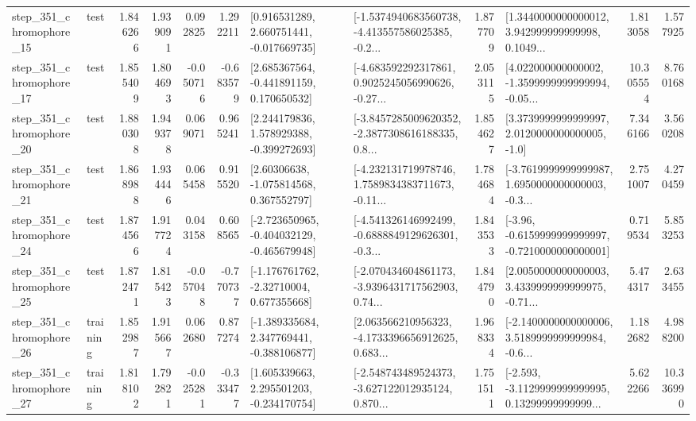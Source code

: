\begin{tabular}{llrrrrllrlrr}
  step\_351\_chromophore\_15 &      test &      1.846266 &    1.939091 &      0.092825 &  1.292211 &    [0.916531289, 2.660751441, -0.017669735] &  [-1.5374940683560738, -4.413557586025385, -0.2... &       1.877709 &  [1.3440000000000012, 3.942999999999998, 0.1049... &            1.813058 &          1.577925 \\
  step\_351\_chromophore\_17 &      test &      1.855409 &    1.804693 &     -0.050716 & -0.683579 &    [2.685367564, -0.441891159, 0.170650532] &  [-4.683592292317861, 0.9025245056990626, -0.27... &       2.053115 &  [4.022000000000002, -1.3599999999999994, -0.05... &           10.305554 &          8.760168 \\
  step\_351\_chromophore\_20 &      test &      1.880308 &    1.949378 &      0.069071 &  0.965241 &    [2.244179836, 1.578929388, -0.399272693] &  [-3.8457285009620352, -2.3877308616188335, 0.8... &       1.854627 &     [3.3739999999999997, 2.0120000000000005, -1.0] &            7.346166 &          3.560208 \\
  step\_351\_chromophore\_21 &      test &      1.868988 &    1.934446 &      0.065458 &  0.915520 &     [2.60306638, -1.075814568, 0.367552797] &  [-4.232131719978746, 1.7589834383711673, -0.11... &       1.784684 &  [-3.7619999999999987, 1.6950000000000003, -0.3... &            2.751007 &          4.270459 \\
  step\_351\_chromophore\_24 &      test &      1.874566 &    1.917724 &      0.043158 &  0.608565 &  [-2.723650965, -0.404032129, -0.465679948] &  [-4.541326146992499, -0.6888849129626301, -0.3... &       1.843533 &  [-3.96, -0.6159999999999997, -0.7210000000000001] &            0.719534 &          5.853253 \\
  step\_351\_chromophore\_25 &      test &      1.872471 &    1.815423 &     -0.057048 & -0.770737 &    [-1.176761762, -2.32710004, 0.677355668] &  [-2.070434604861173, -3.9396431717562903, 0.74... &       1.844790 &  [2.0050000000000003, 3.4339999999999975, -0.71... &            5.474317 &          2.633455 \\
  step\_351\_chromophore\_26 &  training &      1.852987 &    1.915667 &      0.062680 &  0.877274 &   [-1.389335684, 2.347769441, -0.388106877] &  [2.063566210956323, -4.1733396656912625, 0.683... &       1.968334 &  [-2.1400000000000006, 3.5189999999999984, -0.6... &            1.182682 &          4.988200 \\
  step\_351\_chromophore\_27 &  training &      1.818102 &    1.792821 &     -0.025281 & -0.333477 &    [1.605339663, 2.295501203, -0.234170754] &  [-2.548743489524373, -3.627122012935124, 0.870... &       1.751511 &  [-2.593, -3.1129999999999995, 0.13299999999999... &            5.622266 &         10.336990 \\

\end{tabular}
